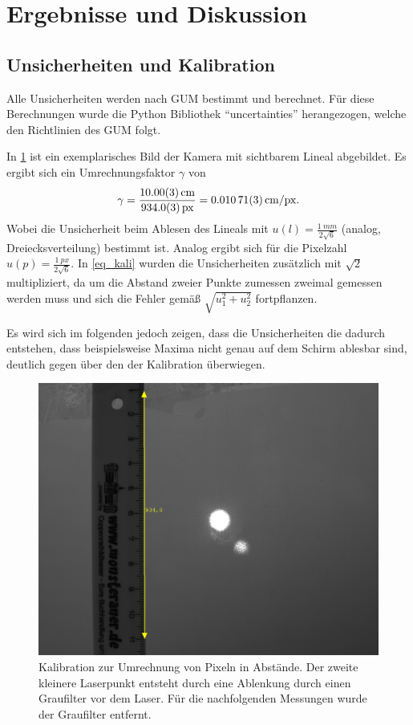 \documentclass[
	a4paper,
	12pt,
	pagesize,
	ngerman
]{scrartcl}
\begin{document}
	\section{Ergebnisse und Diskussion}

	\subsection{Unsicherheiten und Kalibration}
	Alle Unsicherheiten werden nach GUM bestimmt und berechnet.
	Für diese Berechnungen wurde die Python Bibliothek \enquote{uncertainties} herangezogen, welche den Richtlinien des GUM folgt.

	In \cref{fig_kalibration} ist ein exemplarisches Bild der Kamera mit sichtbarem Lineal abgebildet.
	Es ergibt sich ein Umrechnungsfaktor $\gamma$ von
	\begin{equation}
			\label{eq_kali}
			\gamma = \frac{\SI{10.0+-0.03}{cm}}{\SI{934+-0.3}{px}}=\SI{0.01071+-0.00003}{cm/px}.
	\end{equation}
	Wobei die Unsicherheit beim Ablesen des Lineals mit $u(l)=\frac{\SI{1}{mm}}{2\sqrt{6}}$ (analog, Dreiecksverteilung) bestimmt ist.
	Analog ergibt sich für die Pixelzahl $u(p)=\frac{\SI{1}{px}}{2\sqrt{6}}$.
	In \cref{eq_kali} wurden die Unsicherheiten zusätzlich mit $\sqrt{2}$ multipliziert, da um die Abstand zweier Punkte zumessen zweimal gemessen werden muss und sich die Fehler gemäß $\sqrt{u_1^2+u_2^2}$ fortpflanzen.

	Es wird sich im folgenden jedoch zeigen, dass die Unsicherheiten die dadurch entstehen, dass beispielsweise Maxima nicht genau auf dem Schirm ablesbar sind, deutlich gegen über den der Kalibration überwiegen. %


	\begin{figure}[H]
		\includegraphics[width=0.7\linewidth]{raw/0/0_kalibration.png}
					\caption{
						Kalibration zur Umrechnung von Pixeln in Abstände.
						Der zweite kleinere Laserpunkt entsteht durch eine Ablenkung durch einen Graufilter vor dem Laser.
						Für die nachfolgenden Messungen wurde der Graufilter entfernt.
					}
					\label{fig_kalibration}
			\end{figure}
\end{document}
